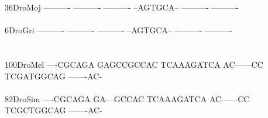 \documentclass[11pt,twoside,reqno,a4paper]{article}
\begin{document}
{36\hspace*{2\charwidth}DroMoj	----------	----------	----------	--AGTGCA--	----------	----------	\\
\hspace*{4\charwidth}\hspace*{7\charwidth}\hspace*{1\charwidth}\hspace*{1\charwidth}\hspace*{1\charwidth}\hspace*{1\charwidth}\hspace*{1\charwidth}\hspace*{1\charwidth}\\
6\hspace*{3\charwidth}DroGri	----------	----------	----------	--AGTGCA--	----------	----------	\\
\hspace*{4\charwidth}\hspace*{7\charwidth}\hspace*{1\charwidth}\hspace*{1\charwidth}\hspace*{1\charwidth}\hspace*{1\charwidth}\hspace*{1\charwidth}\hspace*{1\charwidth}\\
\\
100\hspace*{1\charwidth}DroMel	----CGCAGA	GAGCCGCCAC	TCAAAGATCA	AC------CC	TCGATGGCAG	-------AC-	\\
\hspace*{4\charwidth}\hspace*{7\charwidth}\hspace*{1\charwidth}\hspace*{1\charwidth}\hspace*{1\charwidth}\hspace*{1\charwidth}\hspace*{1\charwidth}\hspace*{1\charwidth}\\
82\hspace*{2\charwidth}DroSim	----CGCAGA	GA---GCCAC	TCAAAGATCA	AC------CC	TCGCTGGCAG	-------AC-	\\
\hspace*{4\charwidth}\hspace*{7\charwidth}\hspace*{1\charwidth}\hspace*{1\charwidth}\hspace*{1\charwidth}\hspace*{1\charwidth}\hspace*{1\charwidth}\hspace*{1\charwidth}\\
}
\end{document}
